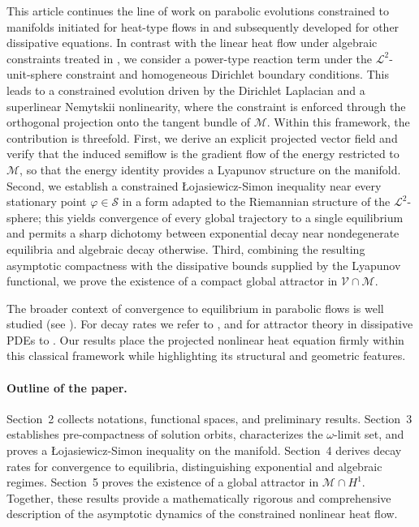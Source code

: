 \documentclass[10pt,a4paper]{amsart}
\numberwithin{equation}{section}
\begin{document}
This article continues the line of work on parabolic evolutions constrained to manifolds
initiated for heat-type flows in \cite{Brz+Huss_2024,Cafe,Hussain_2005,Huss_2023,Rybka}
and subsequently developed for other dissipative equations. In contrast with the linear
heat flow under algebraic constraints treated in \cite{Cafe,Rybka}, we consider a
power-type reaction term under the $\mathcal{L}^{2}$-unit-sphere constraint and
homogeneous Dirichlet boundary conditions. This leads to a constrained evolution driven
by the Dirichlet Laplacian and a superlinear Nemytskii nonlinearity, where the constraint
is enforced through the orthogonal projection onto the tangent bundle of $\mathcal{M}$.
Within this framework, the contribution is threefold. First, we derive an explicit
projected vector field and verify that the induced semiflow is the gradient flow of the
energy restricted to $\mathcal{M}$, so that the energy identity provides a Lyapunov
structure on the manifold. Second, we establish a constrained \L{o}jasiewicz-Simon
inequality near every stationary point $\varphi\in\mathcal{S}$ in a form adapted to the
Riemannian structure of the $\mathcal{L}^{2}$-sphere; this yields convergence of
every global trajectory to a single equilibrium and permits a sharp dichotomy between
exponential decay near nondegenerate equilibria and algebraic decay otherwise.
Third, combining the resulting asymptotic compactness with the dissipative bounds
supplied by the Lyapunov functional, we prove the existence of a compact global
attractor in $\mathcal{V}\cap\mathcal{M}$.

The broader context of convergence to equilibrium in parabolic flows is well
studied (see \cite{BH_LDHilbert_2026,Brz+Huss_2020,Hale,Haraux,Haraux2011,
Haraux2009,Vishnevski,Lions,Matano,Simon}).
For decay rates we refer to \cite{Haraux2003,Songu}, and for attractor theory in
dissipative PDEs to \cite{Carvalho,Songu,Kapustyan,Temam}. Our results place the
projected nonlinear heat equation firmly within this classical framework while
highlighting its structural and geometric features.

\paragraph{Outline of the paper.}
Section~2 collects notations, functional spaces, and preliminary results.
Section~3 establishes pre-compactness of solution orbits, characterizes the
$\omega$-limit set, and proves a \L{o}jasiewicz-Simon inequality on the manifold.
Section~4 derives decay rates for convergence to equilibria, distinguishing
exponential and algebraic regimes. Section~5 proves the existence of a global
attractor in $\mathcal{M}\cap H^1$. Together, these results provide a mathematically
rigorous and comprehensive description of the asymptotic dynamics of the constrained
nonlinear heat flow.
\end{document}
